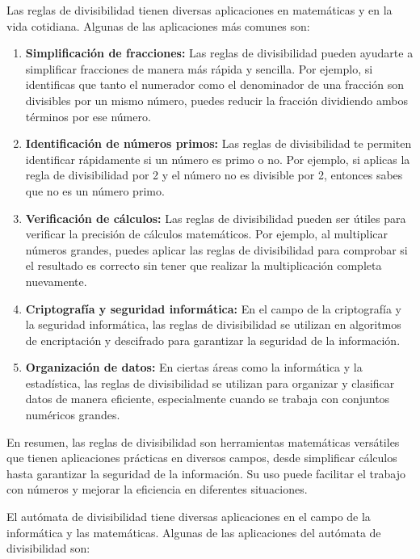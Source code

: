 Las reglas de divisibilidad tienen diversas aplicaciones en matemáticas y en la vida cotidiana. Algunas de las aplicaciones más comunes son:

\begin{enumerate}
	\item \textbf{Simplificación de fracciones:} Las reglas de divisibilidad pueden ayudarte a simplificar fracciones de manera más rápida y sencilla. Por ejemplo, si identificas que tanto el numerador como el denominador de una fracción son divisibles por un mismo número, puedes reducir la fracción dividiendo ambos términos por ese número.
	\item  \textbf{Identificación de números primos:} Las reglas de divisibilidad te permiten identificar rápidamente si un número es primo o no. Por ejemplo, si aplicas la regla de divisibilidad por 2 y el número no es divisible por 2, entonces sabes que no es un número primo.
	\item \textbf{Verificación de cálculos:} Las reglas de divisibilidad pueden ser útiles para verificar la precisión de cálculos matemáticos. Por ejemplo, al multiplicar números grandes, puedes aplicar las reglas de divisibilidad para comprobar si el resultado es correcto sin tener que realizar la multiplicación completa nuevamente.
	\item \textbf{Criptografía y seguridad informática:} En el campo de la criptografía y la seguridad informática, las reglas de divisibilidad se utilizan en algoritmos de encriptación y descifrado para garantizar la seguridad de la información.
	\item \textbf{Organización de datos:} En ciertas áreas como la informática y la estadística, las reglas de divisibilidad se utilizan para organizar y clasificar datos de manera eficiente, especialmente cuando se trabaja con conjuntos numéricos grandes. 
\end{enumerate}

En resumen, las reglas de divisibilidad son herramientas matemáticas versátiles que tienen aplicaciones prácticas en diversos campos, desde simplificar cálculos hasta garantizar la seguridad de la información. Su uso puede facilitar el trabajo con números y mejorar la eficiencia en diferentes situaciones.


El autómata de divisibilidad tiene diversas aplicaciones en el campo de la informática y las matemáticas. Algunas de las aplicaciones del autómata de divisibilidad son:

